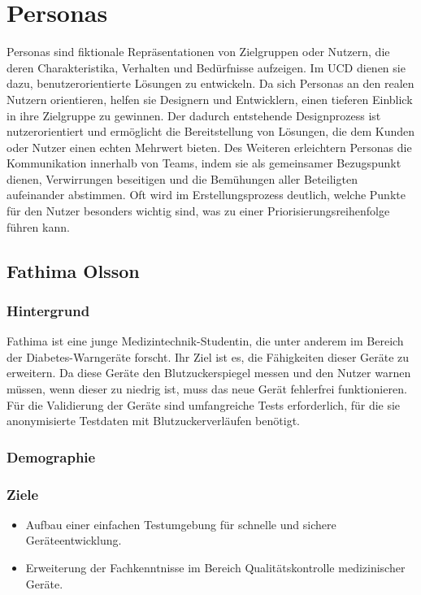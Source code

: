 \chapter{Personas}
\label{cha:Personas}
Personas sind fiktionale Repräsentationen von Zielgruppen oder Nutzern, die deren Charakteristika, Verhalten und Bedürfnisse aufzeigen. 
Im \acl{UCD} dienen sie dazu, benutzerorientierte Lösungen zu entwickeln. Da sich Personas an den realen Nutzern orientieren, helfen sie Designern und Entwicklern, 
einen tieferen Einblick in ihre Zielgruppe zu gewinnen. Der dadurch entstehende Designprozess ist nutzerorientiert und ermöglicht die Bereitstellung von Lösungen, 
die dem Kunden oder Nutzer einen echten Mehrwert bieten. Des Weiteren erleichtern Personas die Kommunikation innerhalb von Teams\cite{Personas96:online}, indem sie als gemeinsamer Bezugspunkt 
dienen, Verwirrungen beseitigen und die Bemühungen aller Beteiligten aufeinander abstimmen. Oft wird im Erstellungsprozess deutlich, welche Punkte für den Nutzer besonders wichtig sind, was zu einer Priorisierungsreihenfolge führen kann.

\section{Fathima Olsson}
\subsection*{Hintergrund}
Fathima ist eine junge Medizintechnik-Studentin, die unter anderem im Bereich der Diabetes-Warngeräte forscht. Ihr Ziel ist es, die Fähigkeiten dieser Geräte zu erweitern. 
Da diese Geräte den Blutzuckerspiegel messen und den Nutzer warnen müssen, wenn dieser zu niedrig ist, muss das neue Gerät fehlerfrei funktionieren. Für die Validierung der 
Geräte sind umfangreiche Tests erforderlich, für die sie anonymisierte Testdaten mit Blutzuckerverläufen benötigt.

\subsection*{Demographie}

\subsection*{Ziele}
\begin{itemize}
    \item Aufbau einer einfachen Testumgebung für schnelle und sichere Geräteentwicklung.
    \item Erweiterung der Fachkenntnisse im Bereich Qualitätskontrolle medizinischer Geräte.
\end{itemize}

